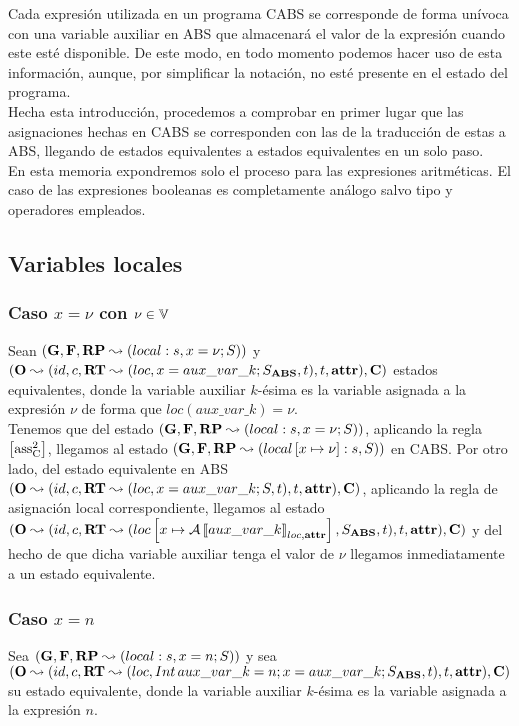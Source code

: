 Cada expresión utilizada en un programa CABS se corresponde de forma unívoca con una variable auxiliar en ABS que almacenará el valor de la expresión cuando este esté disponible. De este modo, en todo momento podemos hacer uso de esta información, aunque, por simplificar la notación, no esté presente en el estado del programa.\\

Hecha esta introducción, procedemos a comprobar en primer lugar que las asignaciones hechas en CABS se corresponden con las de la traducción de estas a ABS, llegando de estados equivalentes a estados equivalentes en un solo paso.\\

En esta memoria expondremos solo el proceso para las expresiones aritméticas. El caso de las expresiones booleanas es completamente análogo salvo tipo y operadores empleados.

\subsection{Variables locales}

\subsubsection{Caso $x = \nu$ con $\nu \in \mathbb{V}$}
Sean $(\mathbf{G}, \mathbf{F}, \textbf{RP} \leadsto (local:s,x = \nu\mbox{;\,}S))$ y $(\mathbf{O} \leadsto (id, c, \textbf{RT} \leadsto (loc, x = aux\_var\_k\mbox{;\,} S_{\textbf{ABS}}, t), t, \textbf{attr}), \mathbf{C})$ estados equivalentes, donde la variable auxiliar $k$-ésima es la variable asignada a la expresión $\nu$ de forma que $loc(aux\_var\_k) = \nu$.\\

Tenemos que del estado $(\mathbf{G}, \mathbf{F}, \textbf{RP} \leadsto (local:s,x = \nu\mbox{;\,}S))$, aplicando la regla $\left[ \text{ass}_{\text{C}}^{2} \right]$, llegamos al estado $(\mathbf{G}, \mathbf{F}, \textbf{RP} \leadsto (local\left[ x\mapsto\nu \right]:s, S))$ en CABS. Por otro lado, del estado equivalente en ABS $(\mathbf{O} \leadsto (id, c, \textbf{RT} \leadsto (loc, x = aux\_var\_k\mbox{;\,} S, t), t, \textbf{attr}), \mathbf{C})$, aplicando la regla de asignación local correspondiente, llegamos al estado $(\mathbf{O} \leadsto (id, c, \textbf{RT} \leadsto (loc \left[ x\mapsto\mathcal{A} \left\llbracket aux\_var\_k \right\rrbracket_{loc, \textbf{attr}} \right], S_{\textbf{ABS}}, t), t, \textbf{attr}), \mathbf{C})$ y del hecho de que dicha variable auxiliar tenga el valor de $\nu$ llegamos inmediatamente a un estado equivalente.

\subsubsection{Caso $x = n$}
Sea $(\mathbf{G}, \mathbf{F}, \textbf{RP} \leadsto (local:s,x = n\mbox{;\,}S))$ y sea $(\mathbf{O} \leadsto (id, c, \textbf{RT} \leadsto (loc, Int\,aux\_var\_k = n\mbox{;\,} x = aux\_var\_k\mbox{;\,} S_{\textbf{ABS}}, t), t, \textbf{attr}), \mathbf{C})$ su estado equivalente, donde la variable auxiliar $k$-ésima es la variable asignada a la expresión $n$.\\

